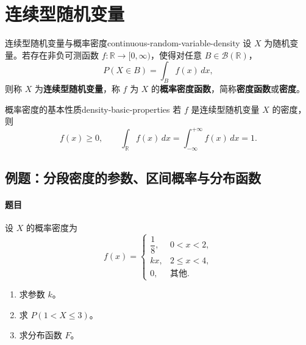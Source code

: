\clearpage\section{连续型随机变量}\label{k:continuous}

\begin{mydefinition}{连续型随机变量与概率密度}{continuous-random-variable-density}
设 $X$ 为随机变量。若存在非负可测函数 $f:\mathbb R\to[0,\infty)$，使得对任意 $B\in\mathscr B(\mathbb R)$，
\[
P(X\in B)=\int_B f(x)\,dx,
\]
则称 $X$ 为\textbf{连续型随机变量}，称 $f$ 为 $X$ 的\textbf{概率密度函数}，简称\textbf{密度函数}或\textbf{密度}。
\end{mydefinition}

\begin{proposition}{概率密度的基本性质}{density-basic-properties}
若 $f$ 是连续型随机变量 $X$ 的密度，则
\[
f(x)\geq0,\qquad
\int_{\mathbb R}f(x)\,dx
=\int_{-\infty}^{+\infty}f(x)\,dx=1.
\]
\end{proposition}

\subsection{例题：分段密度的参数、区间概率与分布函数}\label{note:c2:e10}
\paragraph{题目}
设 $X$ 的概率密度为
\[
f(x)=
\begin{cases}
\dfrac18,&0<x<2,\\[0.4em]
kx,&2\leq x<4,\\
0,&\text{其他}.
\end{cases}
\]
\begin{enumerate}
\item 求参数 $k$。
\item 求 $P(1<X\leq3)$。
\item 求分布函数 $F$。
\end{enumerate}

